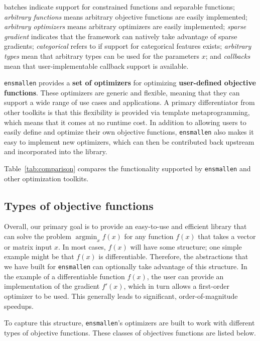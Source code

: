 \begin{table}[t!]
{{{batches} indicate support for constrained functions and separable functions;
{\it arbitrary functions} means arbitrary objective functions are easily
implemented; {\it arbitrary optimizers} means arbitrary optimizers are easily
implemented; {\it sparse gradient} indicates that the framework can natively
take advantage of sparse gradients; {\it categorical} refers to if support
for categorical features exists; {\it arbitrary types} mean that arbitrary types
can be used for the parameters $x$; and {\it callbacks} mean that
user-implementable callback support is available.
}}
\label{tab:comparison}
\end{table}

{\tt ensmallen} provides a {\bf set of optimizers} for optimizing {\bf
user-defined objective functions}.  These optimizers are generic and flexible,
meaning that they can support a wide range of use cases and applications.  A
primary differentiator from other toolkits is that this flexibility is provided
via template metaprogramming, which means that it comes at no runtime cost.
In addition to allowing users to easily define and optimize their own objective
functions, {\tt ensmallen} also makes it easy to implement new optimizers, which
can then be contributed back upstream and incorporated into the library.

Table~\ref{tab:comparison} compares the functionality
supported by {\tt ensmallen} and other optimization toolkits.

\subsection{Types of objective functions}

Overall, our primary goal is to provide an easy-to-use and efficient library
that can solve the problem $\operatorname{argmin}_x f(x)$ for any function
$f(x)$ that takes a vector or matrix input $x$.  In most cases, $f(x)$ will have
some structure; one simple example might be that $f(x)$ is differentiable.
Therefore, the abstractions that we have built for {\tt ensmallen} can
optionally take advantage of this structure.  In the example of a differentiable
function $f(x)$, the user can provide an implementation of the gradient $f'(x)$,
which in turn allows a first-order optimizer to be used.  This generally leads
to significant, order-of-magnitude speedups.

To capture this structure, {\tt ensmallen}'s optimizers are built to work with
different types of objective functions.  These classes of objectives functions
are listed below.


